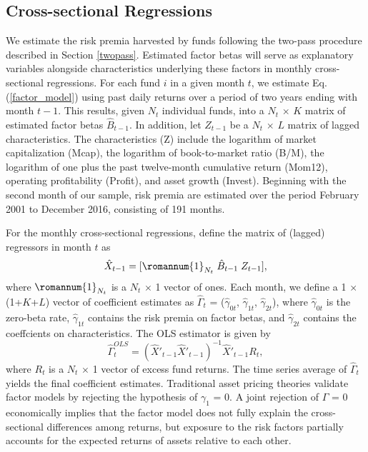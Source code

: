 \subsection{Cross-sectional Regressions}
We estimate the risk premia harvested by funds following the \citet{fama1973risk} two-pass procedure described in Section \ref{twopass}. Estimated factor betas will serve as explanatory variables alongside characteristics underlying these factors in monthly cross-sectional regressions. For each fund $i$ in a given month $t$, we estimate Eq.(\ref{factor_model}) using past daily returns over a period of two years ending with month $t-1$. This results, given $N_t$ individual funds, into a $N_t$ $\times$ $K$ matrix of estimated factor betas $\hat{B}_{t-1}$. In addition, let $Z_{t-1}$ be a $N_t$ $\times$ $L$  matrix of lagged characteristics. The characteristics (Z) include the logarithm of market capitalization (Mcap), the logarithm of book-to-market ratio (B/M), the logarithm of one plus the past twelve-month cumulative return (Mom12), operating profitability (Profit), and asset growth (Invest). Beginning with the second month of our sample, risk premia are estimated over the period February 2001 to December 2016, consisting of 191 months.  
\par For the monthly cross-sectional regressions, define the matrix of (lagged) regressors in month $t$ as
\begin{equation}
    \label{X}
    \hat{X}_{t-1} = [\romannum{1}_{N_t} \hspace{0.1cm}\hat{B}_{t-1} \hspace{0.1cm} Z_{t-1}], 
\end{equation}
where $\romannum{1}_{N_t}$ is a $N_t$ $\times$ 1 vector of ones. 
Each month, we define a 1 $\times$ (1+$K$+$L$) vector of coefficient estimates as $\hat{\Gamma}_{t}$ = ($\hat{\gamma}_{0t}$, $\hat{\gamma}_{1t}$, $\hat{\gamma}_{2t}$), where $\hat{\gamma}_{0t}$ is the zero-beta rate,  $\hat{\gamma}_{1t}$ contains the risk premia on factor betas, and $\hat{\gamma}_{2t}$ contains the coeffcients on characteristics. The OLS estimator is given by
\begin{equation}
\label{Y_OLS}
    \hat{\Gamma}^{OLS}_{t} = (\hat{X}'_{t-1}\hat{X}'_{t-1})^{-1}\hat{X}'_{t-1}R_t,
\end{equation}
where $R_t$ is a $N_t$ $\times$ 1 vector of excess fund returns. The time series average of $\hat{\Gamma}_{t}$ yields the final coefficient estimates. Traditional asset pricing theories validate factor models by rejecting the hypothesis of $\gamma_1$ = 0. A joint rejection of $\Gamma$ = 0 economically implies that the factor model does not fully explain the cross-sectional differences among returns, but exposure to the risk factors partially accounts for the expected returns of assets relative to each other. 

